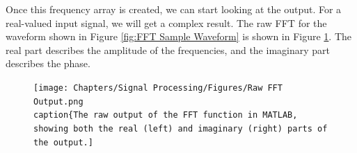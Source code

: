 Once this frequency array is created, we can start looking at the output.
For a real-valued input signal, we will get a complex result.
The raw FFT for the waveform shown in Figure \ref{fig:FFT Sample Waveform} is shown in Figure \ref{fig:Raw FFT Output}.
The real part describes the amplitude of the frequencies, and the imaginary part describes the phase.

\begin{figure}[H]
    \centering
    \texttt{[image: Chapters/Signal Processing/Figures/Raw FFT Output.png
    \\caption\{The raw output of the FFT function in MATLAB, showing both the real (left) and imaginary (right) parts of the output.]}
    \label{fig:Raw FFT Output}
\end{figure}